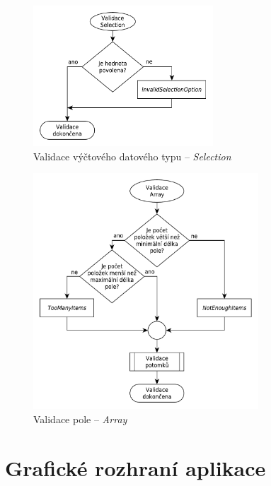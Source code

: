 \documentclass[FM,bw,DP]{tulthesis}
\begin{document}
\begin{figure}[h]
	\centering
    \includegraphics[width=0.6\textwidth]{../img/validation_selection.pdf}
    \caption{Validace výčtového datového typu -- \textit{Selection}}
	\label{img:validation_selection}
\end{figure}

\begin{figure}[h]
	\centering
    \includegraphics[width=0.75\textwidth]{../img/validation_array.pdf}
    \caption{Validace pole -- \textit{Array}}
	\label{img:validation_array}
\end{figure}



\chapter{Grafické rozhraní aplikace}
\label{apx:gui}
\end{document}
